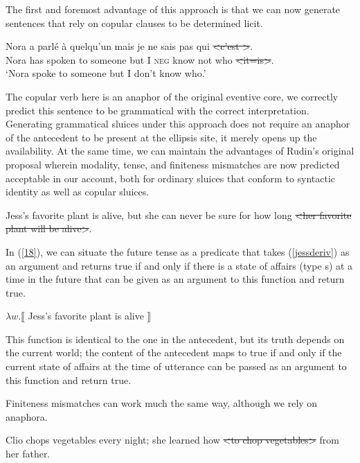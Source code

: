 \documentclass{turabian-researchpaper}
\begin{document}
The first and foremost advantage of this approach is that we can now generate sentences that rely on copular clauses to be determined licit. 

\begin{exe}
\ex\label{noraspoke}
\gll Nora a {parl\'e} \`a quelqu'un mais je ne sais pas qui \sout{\textless c'est \textgreater}.\\
Nora has spoken to someone but I \textsc{neg} know not who \sout{\textless it=is\textgreater}. \\
\trans `Nora spoke to someone but I don't know who.'
\end{exe}

The copular verb here is an anaphor of the original eventive core, we correctly predict this sentence to be grammatical with the correct interpretation. Generating grammatical sluices under this approach does not require an anaphor of the antecedent to be present at the ellipsis site, it merely opens up the availability. At the same time, we can maintain the advantages of Rudin's original proposal wherein modality, tense, and finiteness mismatches are now predicted acceptable in our account, both for ordinary sluices that conform to syntactic identity as well as copular sluices.        

\begin{exe}
 Jess's favorite plant is alive, but she can never be sure for how long \sout{\textless her favorite plant will be alive\textgreater}. 
\end{exe}

In (\ref{18}), we can situate the future tense as a predicate that takes (\ref{jessderiv}) as an argument and returns true if and only if there is a state of affairs (type s) at a time in the future that can be given as an argument to this function and return true.

\begin{exe}
\ex\label{jessderiv} $\lambda w.\llbracket$ Jess's favorite plant is alive $\rrbracket$
\end{exe}

This function is identical to the one in the antecedent, but its truth depends on the current world; the content of the antecedent maps to true if and only if the current state of affairs at the time of utterance can be passed as an argument to this function and return true.

Finiteness mismatches can 
work much the same way, although we rely on anaphora. 

\begin{exe}
 Clio chops vegetables every night; she learned how \sout{\textless to chop vegetables\textgreater} from her father.
\end{exe}
\end{document}
